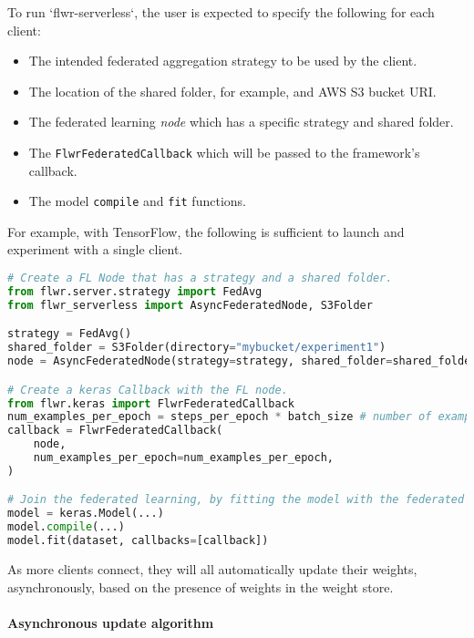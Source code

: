 \documentclass[twocolumn, switch]{article} %
\begin{document}
To run `flwr-serverless`, the user is expected to specify the following for each client:

\begin{itemize}
    \item The intended federated aggregation strategy to be used by the client.
    \item The location of the shared folder, for example, and AWS S3 bucket URI.
    \item The federated learning \textit{node} which has a specific strategy and shared folder.
    \item The \texttt{FlwrFederatedCallback} which will be passed to the framework's callback.
    \item The model \texttt{compile} and \texttt{fit} functions.
\end{itemize}

For example, with TensorFlow, the following is sufficient to launch and experiment with a single client. 

\begin{lstlisting}[language=Python]
# Create a FL Node that has a strategy and a shared folder.
from flwr.server.strategy import FedAvg
from flwr_serverless import AsyncFederatedNode, S3Folder

strategy = FedAvg()
shared_folder = S3Folder(directory="mybucket/experiment1")
node = AsyncFederatedNode(strategy=strategy, shared_folder=shared_folder)

# Create a keras Callback with the FL node.
from flwr.keras import FlwrFederatedCallback
num_examples_per_epoch = steps_per_epoch * batch_size # number of examples used in each epoch
callback = FlwrFederatedCallback(
    node,
    num_examples_per_epoch=num_examples_per_epoch,
)

# Join the federated learning, by fitting the model with the federated callback.
model = keras.Model(...)
model.compile(...)
model.fit(dataset, callbacks=[callback])
\end{lstlisting}

As more clients connect, they will all automatically update their weights, asynchronously, based on the presence of weights in the weight store.

\paragraph{Asynchronous update algorithm}
\end{document}
